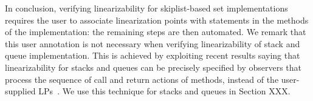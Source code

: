 In conclusion, verifying linearizability for skiplist-based set implementations
requires the user to associate linearization points with statements in the
methods of the implementation: the remaining steps are then automated.
We remark that this user annotation is not necessary when verifying
linearizability of stack and queue implementation. 
This is achieved by exploiting recent results saying that
linearizability for stacks and queues can be precisely specified by
observers that process the sequence of call and return actions of
methods,  instead of the user-supplied LPs~\cite{BEEH:icalp15,HSV:concur13}.
We use this technique for stacks and queues in Section XXX.



